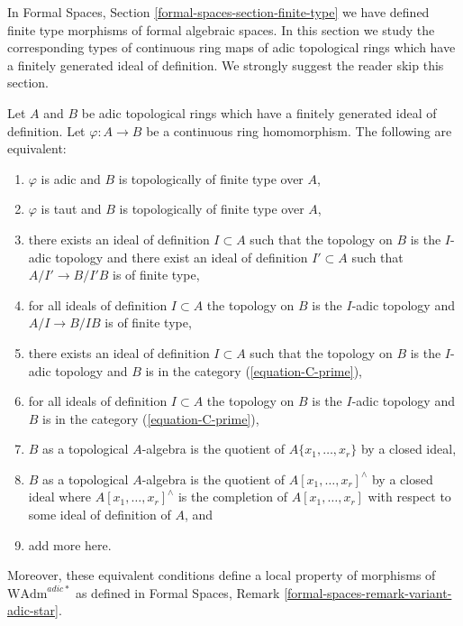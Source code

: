 \noindent
In Formal Spaces, Section \ref{formal-spaces-section-finite-type}
we have defined finite type morphisms of formal algebraic spaces.
In this section we study the corresponding types of continuous
ring maps of adic topological rings which have a finitely generated
ideal of definition. We strongly suggest the reader skip this section.

\begin{lemma}
\label{lemma-finite-type}
Let $A$ and $B$ be adic topological rings which have a finitely generated
ideal of definition. Let $\varphi : A \to B$ be a continuous ring homomorphism.
The following are equivalent:
\begin{enumerate}
\item $\varphi$ is adic and $B$ is topologically of finite type over $A$,
\item $\varphi$ is taut and $B$ is topologically of finite type over $A$,
\item there exists an ideal of definition $I \subset A$ such that
the topology on $B$ is the $I$-adic topology and there exist an ideal
of definition $I' \subset A$ such that $A/I' \to B/I'B$ is of finite type,
\item for all ideals of definition $I \subset A$ the topology on $B$
is the $I$-adic topology and $A/I \to B/IB$ is of finite type,
\item there exists an ideal of definition $I \subset A$ such that
the topology on $B$ is the $I$-adic topology and $B$ is in the category
(\ref{equation-C-prime}),
\item for all ideals of definition $I \subset A$ the topology on $B$
is the $I$-adic topology and $B$ is in the category (\ref{equation-C-prime}),
\item $B$ as a topological $A$-algebra is the quotient of
$A\{x_1, \ldots, x_r\}$ by a closed ideal,
\item $B$ as a topological $A$-algebra is the quotient of
$A[x_1, \ldots, x_r]^\wedge$ by a closed ideal where
$A[x_1, \ldots, x_r]^\wedge$ is the completion of $A[x_1, \ldots, x_r]$
with respect to some ideal of definition of $A$, and
\item add more here.
\end{enumerate}
Moreover, these equivalent conditions define
a local property of morphisms of $\text{WAdm}^{adic*}$ as defined in
Formal Spaces, Remark \ref{formal-spaces-remark-variant-adic-star}.
\end{lemma}

